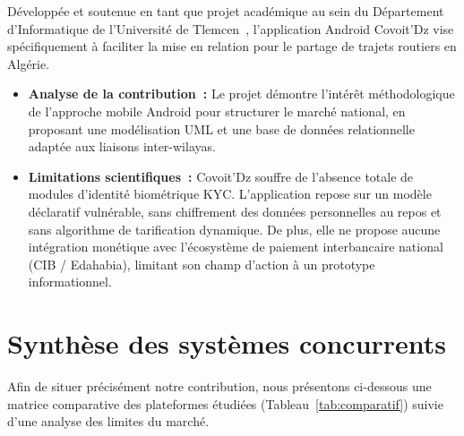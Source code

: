 Développée et soutenue en tant que projet académique au sein du Département d'Informatique de l'Université de Tlemcen~\cite{merad_covoitdz_2024}, l'application Android Covoit'Dz vise spécifiquement à faciliter la mise en relation pour le partage de trajets routiers en Algérie.
\begin{itemize}
  \item \textbf{Analyse de la contribution~:} Le projet démontre l'intérêt méthodologique de l'approche mobile Android pour structurer le marché national, en proposant une modélisation UML et une base de données relationnelle adaptée aux liaisons inter-wilayas.
  \item \textbf{Limitations scientifiques~:} Covoit'Dz souffre de l'absence totale de modules d'identité biométrique KYC. L'application repose sur un modèle déclaratif vulnérable, sans chiffrement des données personnelles au repos et sans algorithme de tarification dynamique. De plus, elle ne propose aucune intégration monétique avec l'écosystème de paiement interbancaire national (CIB / Edahabia), limitant son champ d'action à un prototype informationnel.
\end{itemize}

\section{Synthèse des systèmes concurrents}
\label{sec:comparatif}

Afin de situer précisément notre contribution, nous présentons ci-dessous une matrice comparative des plateformes étudiées (Tableau~\ref{tab:comparatif}) suivie d'une analyse des limites du marché.

